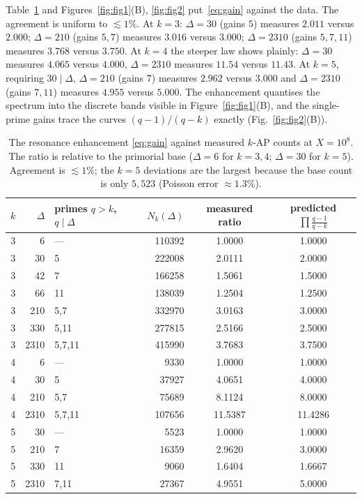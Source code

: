 \documentclass[11pt]{article}
\theoremstyle{definition}
\begin{document}
Table~\ref{tab:res} and Figures~\ref{fig:fig1}(B), \ref{fig:fig2} put~\eqref{eq:gain} against the
data. The agreement is uniform to $\lesssim1\%$. At $k=3$: $\Delta=30$ (gains $5$) measures
$2.011$ versus $2.000$; $\Delta=210$ (gains $5,7$) measures $3.016$ versus $3.000$; $\Delta=2310$
(gains $5,7,11$) measures $3.768$ versus $3.750$. At $k=4$ the steeper law shows plainly: $\Delta=30$
measures $4.065$ versus $4.000$, $\Delta=2310$ measures $11.54$ versus $11.43$. At $k=5$, requiring
$30\mid\Delta$, $\Delta=210$ (gains $7$) measures $2.962$ versus $3.000$ and $\Delta=2310$ (gains
$7,11$) measures $4.955$ versus $5.000$. The enhancement quantises the spectrum into the discrete
bands visible in Figure~\ref{fig:fig1}(B), and the single-prime gains trace the curves
$(q-1)/(q-k)$ exactly (Fig.~\ref{fig:fig2}(B)).

\begin{table}[t]
\centering\small
\begin{tabular}{rrlrcc}
\toprule
$k$ & $\Delta$ & primes $q>k$, $q\mid\Delta$ & $N_k(\Delta)$ & measured ratio & predicted $\prod\frac{q-1}{q-k}$\\
\midrule
3 & 6    & ---     & 110392 & 1.0000 & 1.0000\\
3 & 30   & 5       & 222008 & 2.0111 & 2.0000\\
3 & 42   & 7       & 166258 & 1.5061 & 1.5000\\
3 & 66   & 11      & 138039 & 1.2504 & 1.2500\\
3 & 210  & 5,7     & 332970 & 3.0163 & 3.0000\\
3 & 330  & 5,11    & 277815 & 2.5166 & 2.5000\\
3 & 2310 & 5,7,11  & 415990 & 3.7683 & 3.7500\\
\midrule
4 & 6    & ---     & 9330   & 1.0000 & 1.0000\\
4 & 30   & 5       & 37927  & 4.0651 & 4.0000\\
4 & 210  & 5,7     & 75689  & 8.1124 & 8.0000\\
4 & 2310 & 5,7,11  & 107656 & 11.5387& 11.4286\\
\midrule
5 & 30   & ---     & 5523   & 1.0000 & 1.0000\\
5 & 210  & 7       & 16359  & 2.9620 & 3.0000\\
5 & 330  & 11      & 9060   & 1.6404 & 1.6667\\
5 & 2310 & 7,11    & 27367  & 4.9551 & 5.0000\\
\bottomrule
\end{tabular}
\caption{The resonance enhancement \eqref{eq:gain} against measured $k$-AP counts at $X=10^{8}$. The
ratio is relative to the primorial base ($\Delta=6$ for $k=3,4$; $\Delta=30$ for $k=5$). Agreement is
$\lesssim1\%$; the $k=5$ deviations are the largest because the base count is only $5{,}523$
(Poisson error $\approx1.3\%$).}
\label{tab:res}
\end{table}
\end{document}
